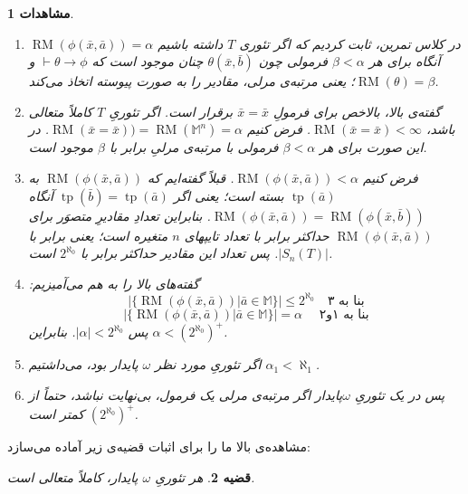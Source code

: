 \documentclass[12pt,a4paper]{report}
\theoremstyle{colorhead}
\newtheorem{thm}{قضیه}
\newtheorem{moshahedat}[thm]{مشاهدات}
\DeclareMathOperator{\RM}{RM}
\DeclareMathOperator{\tp}{tp}
\begin{document}
\begin{moshahedat}
\hfill
\begin{enumerate}
\item 
در کلاس تمرین، ثابت کردیم که اگر تئوری
$T$
داشته باشیم
$\RM(\phi(\bar{x},\bar{a}))=\alpha$
آنگاه برای هر
$\beta<\alpha$
فرمولی چون
$\theta(\bar{x},\bar{b})$
چنان موجود است که 
$\vdash \theta\to \phi$
و
$\RM(\theta)=\beta$؛
یعنی مرتبه‌ی مرلی، مقادیر را به صورت پیوسته اتخاذ می‌کند. 
\item 

گفته‌ی بالا، بالاخص برای فرمولِ
$\bar{x}=\bar{x}$
برقرار است. اگر تئوریِ
$T$
کاملاً متعالی باشد، 
$\RM(\bar{x}=\bar{x})<\infty$.
فرض کنیم
$\RM(\bar{x}=\bar{x}))=\RM(\mathbb{M}^n)=\alpha$.
در این صورت برای هر 
$\beta<\alpha$
فرمولی با مرتبه‌ی مرلیِ برابر با
$\beta$
موجود است.
\item  
 فرض کنیم
$\RM(\phi(\bar{x},\bar{a}))<\alpha$.
قبلاً گفته‌ایم که 
$\RM(\phi(\bar{x},\bar{a}))$
به
$\tp(\bar{a})$
بسته است؛ یعنی اگر
$\tp(\bar{b})=\tp(\bar{a})$
آنگاه
$\RM(\phi(\bar{x},\bar{a}))=\RM(\phi(\bar{x},\bar{b}))$.
بنابراین تعدادِ مقادیرِ متصوَر برای
$\RM(\phi(\bar{x},\bar{a}))$
حداکثر برابر با تعداد تایپهای 
$n$
متغیره است؛ یعنی برابر با
$|S_n(T)|$.
پس تعداد این مقادیر حداکثر برابر با
$2^{\aleph_0}$
است. 
\item 
گفته‌های بالا را به هم می‌‌آمیزیم:
\[
|\{\RM(\phi(\bar{x},\bar{a}))|\bar{a}\in \mathbb{M}\}|\leq 2^{\aleph_0}
\quad \text{بنا به ۳}
\]
\[
|\{\RM(\phi(\bar{x},\bar{a}))|\bar{a}\in \mathbb{M}\}|=\alpha
\quad \text{  بنا به ۱و۲} 
\]
پس
$|\alpha|<2^{\aleph_0}$.
بنابراین
$\alpha<(2^{\aleph_0})^+$.
\item 
اگر تئوریِ مورد نظر
$\omega$
پایدار بود، می‌داشتیم
$\alpha_1<\aleph_1$.
\item 
پس 
در یک تئوریِ
$\omega$پایدار
اگر مرتبه‌ی مرلی یک فرمول، بی‌نهایت نباشد، حتماً
از
$(2^{\aleph_0})^+$
کمتر است.
\end{enumerate}
\end{moshahedat}
مشاهده‌ی بالا ما را برای اثبات قضیه‌ی زیر آماده می‌سازد:
\begin{thm}
هر تئوریِ
$\omega$
پایدار، کاملاً متعالی است. 
\end{thm}
\end{document}
